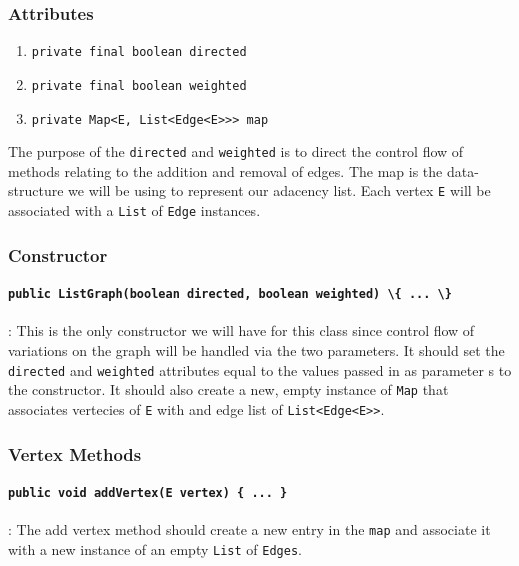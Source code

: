 \subsubsection{Attributes}

\begin{enumerate}
    \item \lstinline|private final boolean directed| 
    \item \lstinline|private final boolean weighted|
    \item \lstinline|private Map<E, List<Edge<E>>> map|
\end{enumerate}

The purpose of the \lstinline|directed| and \lstinline|weighted| is to direct
the control flow of methods relating to the addition and removal of edges. 
The map is the data-structure we will be using to represent our adacency list.
Each vertex \lstinline|E| will be associated with a \lstinline|List| of 
\lstinline|Edge| instances. 

\subsubsection{Constructor}

\paragraph{\lstinline|public ListGraph(boolean directed, boolean weighted) \{
... \}|}: This is the only constructor we will have for this class since
control flow of variations on the graph will be handled via the two parameters.
It should set the \lstinline|directed| and \lstinline|weighted| attributes
equal to the values passed in as parameter s to the constructor. It should also
create a new, empty instance of \lstinline|Map| that associates vertecies of
\lstinline|E| with and edge list of \lstinline|List<Edge<E>>|.



\subsubsection{Vertex Methods}

\paragraph{\lstinline|public void addVertex(E vertex) { ... }|}: The add
vertex method should create a new entry in the \lstinline|map| and associate it
with a new instance of an empty \lstinline|List| of \lstinline|Edges|.

